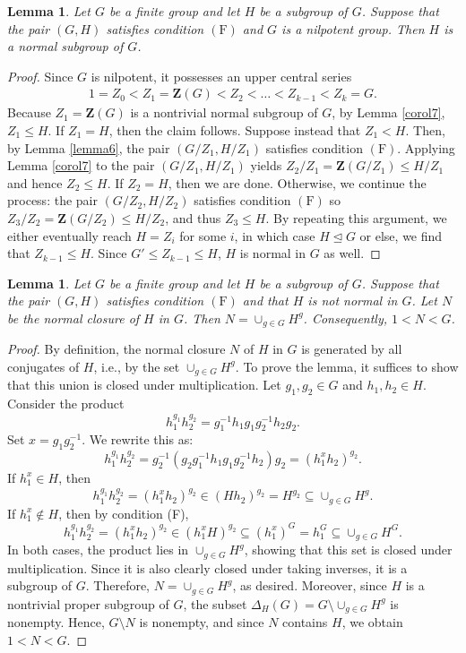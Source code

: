\documentclass[twoside,a4paper,reqno,11pt]{amsart}
\newcommand{\<}{\langle}
\renewcommand{\>}{\rangle}
\newcommand{\leqs}{\leqslant}
\newcommand{\z}{\mathbf{Z}}
\newcommand{\F}{\mathrm{(F)}}
\renewcommand{\leq}{\leqs}
\renewcommand{\:}{\colon}
\newtheorem{lem}[thm]{Lemma}
\theoremstyle{definition}
\begin{document}
\begin{lem}\label{lemma9}
Let $G$ be a finite group and let $H$ be a subgroup of $G$. Suppose that the pair $(G,H)$ satisfies condition $\F$ and $G$ is a nilpotent group. Then $H$ is a normal subgroup of $G$.
\end{lem}
\begin{proof}
	Since $G$ is nilpotent, it possesses an upper central series
	\begin{align*}
		1 = Z_0 < Z_1 = \z(G) <Z_2 <\ldots <  Z_{k-1}<Z_k = G.
	\end{align*}
	Because $Z_1 = \z(G)$ is a nontrivial normal subgroup of $G$, by Lemma \ref{corol7},  $Z_1\leq H$. If $Z_1 = H$, then the claim follows. Suppose instead that $Z_1<H$.   Then, by Lemma \ref{lemma6}, the pair $\left(G/Z_1,H/Z_1\right)$ satisfies condition $\F$. Applying Lemma \ref{corol7} to the pair $(G/Z_1, H/Z_1)$ yields $Z_2/Z_1=\z(G/Z_1)\leq H/Z_1$ and hence  $Z_2\leq H$. If $Z_2 = H$, then we are done. Otherwise, we continue the process:  the pair $(G/Z_2, H/Z_2)$ satisfies condition $\F$ so $Z_3/Z_2 = \z(G/Z_2) \leq H/Z_2$, and thus $Z_3\leq H$.  By repeating this argument, we either eventually reach  $H=Z_i$ for some $i$, in which case $H\unlhd G$ or else, we find that  $Z_{k-1}\leq H$.  Since $G'\leq Z_{k-1}\leq H$, $H$ is normal in $G$ as well.
\end{proof}

\begin{lem}\label{lemma11}
Let $G$ be a finite group and let $H$ be a subgroup of $G$.	Suppose that the pair $(G,H)$ satisfies condition $\F$ and that $H$ is not normal in $G$. Let $N$ be the normal closure of $H$  in $G$. Then $N=\cup_{g\in G}H^g$. Consequently,  $1<N<G$. 
\end{lem}
\begin{proof}
	By definition, the normal closure $N$ of $H$ in $G$ is generated by all conjugates of $H$, i.e., by the set $\cup_{g\in G}H^g$. To prove the lemma, it suffices to show that this union is closed under multiplication. Let $g_1,g_2\in G$ and $h_1,h_2\in H$. Consider the product $$h_1^{g_1}h_2^{g_2}=g_1^{-1}h_1g_1g_2^{-1}h_2g_2.$$ Set $x=g_1g_2^{-1}$. We rewrite this as:
	\[	 h_1^{g_1}h_2^{g_2}=g_2^{-1}(g_2g_1^{-1}h_1g_1g_2^{-1}h_2)g_2 = \left(h_1^{x}h_2\right)^{g_2}. \]
	If $h_1^{x} \in H$, then 
	\[	h_1^{g_1}h_2^{g_2}=\left(h_1^{x}h_2\right)^{g_2}  \in (Hh_2)^{g_2} = H^{g_2} \subseteq\cup_{g\in G}H^g.\]
	If $h_1^{x} \notin H$, then by condition (F), 
	\[	h_1^{g_1}h_2^{g_2} = \left(h_1^{x}h_2\right)^{g_2} \in \left(h_1^{x}H\right)^{g_2}\subseteq \left(h_1^{x}\right)^G = h_1^{G} \subseteq \cup_{g\in G}H^G.\]
	In both cases, the product lies in $\cup_{g\in G}H^g$, showing that this set is closed under multiplication.  Since it is also clearly closed under taking inverses, it is a subgroup of $G$. Therefore, $N=\cup_{g\in G}H^g$, as desired. Moreover, since $H$ is a nontrivial proper subgroup of $G$, the subset $\Delta_H(G) = G\setminus \cup_{g\in G}H^g$ is nonempty. Hence, $G\setminus N$ is nonempty, and since $N$ contains $H$, we obtain $1<N<G$. 
\end{proof}
\end{document}
